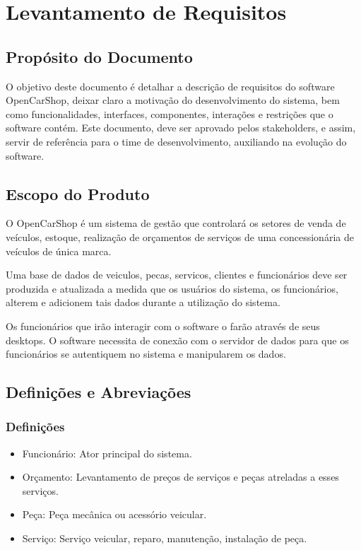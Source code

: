 \section{Levantamento de Requisitos}\label{requisitos}

\subsection{Propósito do Documento}
\par
O objetivo deste documento é detalhar a descrição de requisitos do software OpenCarShop, deixar claro a motivação do desenvolvimento do sistema, bem como funcionalidades, interfaces, componentes, interações e restrições que o software contém. Este documento, deve ser aprovado pelos stakeholders, e assim, servir de referência para o time de desenvolvimento, auxiliando na evolução do software.




\subsection{Escopo do Produto}
\par
O OpenCarShop é um sistema de gestão que controlará os setores de venda de veículos, estoque, realização de orçamentos de serviços de uma concessionária de veículos de única marca. 
\par
Uma base de dados de veiculos, pecas, servicos, clientes e funcionários deve ser produzida e atualizada a medida que os usuários do sistema, os funcionários, alterem e adicionem tais dados durante a utilização do sistema.
\par
Os funcionários que irão interagir com o software o farão através de seus desktops. O software necessita de conexão com o servidor de dados para que os funcionários se autentiquem no sistema e manipularem os dados. 




\subsection{Definições e Abreviações}
	\subsubsection{Definições}
	
	\begin{itemize}
		\item Funcionário: Ator principal do sistema.
		\item Orçamento: Levantamento de preços  de serviços e peças atreladas a esses serviços.
		\item Peça: Peça mecânica ou acessório veicular.
		\item Serviço: Serviço veicular, reparo, manutenção, instalação de peça.
	\end{itemize}
	
